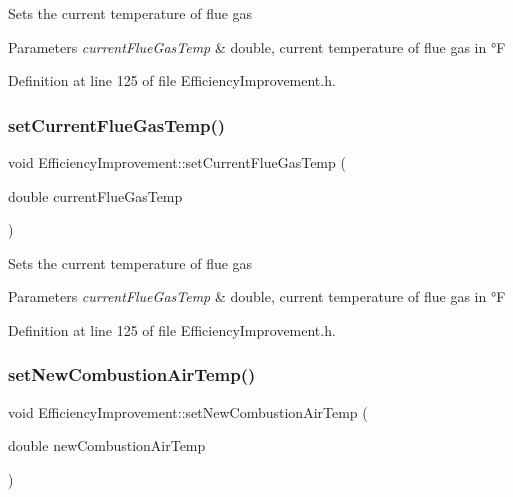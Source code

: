 Sets the current temperature of flue gas


\begin{DoxyParams}{Parameters}
{\em current\+Flue\+Gas\+Temp} & double, current temperature of flue gas in °F \\
\hline
\end{DoxyParams}


Definition at line 125 of file Efficiency\+Improvement.\+h.

\mbox{\label{class_efficiency_improvement_aef6ffeae5135982ef223ce4a5efe23d8}} 
\subsubsection{\texorpdfstring{set\+Current\+Flue\+Gas\+Temp()}{setCurrentFlueGasTemp()}\hspace{0.1cm}{\footnotesize\ttfamily [3/3]}}
{\footnotesize\ttfamily void Efficiency\+Improvement\+::set\+Current\+Flue\+Gas\+Temp (\begin{DoxyParamCaption}\item[{double}]{current\+Flue\+Gas\+Temp }\end{DoxyParamCaption})\hspace{0.3cm}{\ttfamily [inline]}}

Sets the current temperature of flue gas


\begin{DoxyParams}{Parameters}
{\em current\+Flue\+Gas\+Temp} & double, current temperature of flue gas in °F \\
\hline
\end{DoxyParams}


Definition at line 125 of file Efficiency\+Improvement.\+h.

\mbox{\label{class_efficiency_improvement_a93705877dfad913c6282fbd31e66c41a}} 
\subsubsection{\texorpdfstring{set\+New\+Combustion\+Air\+Temp()}{setNewCombustionAirTemp()}\hspace{0.1cm}{\footnotesize\ttfamily [1/3]}}
{\footnotesize\ttfamily void Efficiency\+Improvement\+::set\+New\+Combustion\+Air\+Temp (\begin{DoxyParamCaption}\item[{double}]{new\+Combustion\+Air\+Temp }\end{DoxyParamCaption})\hspace{0.3cm}{\ttfamily [inline]}}

